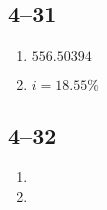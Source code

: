 \documentclass[a4paper, 12pt, reqno]{amsart}
\numberwithin{equation}{section}
\begin{document}
\subsection*{4--31}

\begin{enumerate}[label=(alph*)]
    \item $556.50394$
    \item $i = 18.55\%$
\end{enumerate}

\subsection*{4--32}

\begin{enumerate}[label=(alph*)]
    \item 
    \item 
\end{enumerate}
\end{document}
